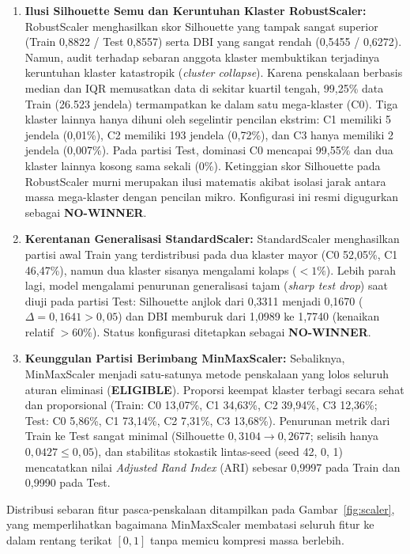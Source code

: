 \documentclass[conference]{IEEEtran}
\begin{document}
\begin{enumerate}
\item \textbf{Ilusi Silhouette Semu dan Keruntuhan Klaster RobustScaler:} RobustScaler menghasilkan skor Silhouette yang tampak sangat superior (Train 0,8822 / Test 0,8557) serta DBI yang sangat rendah (0,5455 / 0,6272). Namun, audit terhadap sebaran anggota klaster membuktikan terjadinya keruntuhan klaster katastropik (\textit{cluster collapse}). Karena penskalaan berbasis median dan IQR memusatkan data di sekitar kuartil tengah, 99,25\% data Train (26.523 jendela) termampatkan ke dalam satu mega-klaster (C0). Tiga klaster lainnya hanya dihuni oleh segelintir pencilan ekstrim: C1 memiliki 5 jendela (0,01\%), C2 memiliki 193 jendela (0,72\%), dan C3 hanya memiliki 2 jendela (0,007\%). Pada partisi Test, dominasi C0 mencapai 99,55\% dan dua klaster lainnya kosong sama sekali (0\%). Ketinggian skor Silhouette pada RobustScaler murni merupakan ilusi matematis akibat isolasi jarak antara massa mega-klaster dengan pencilan mikro. Konfigurasi ini resmi digugurkan sebagai \textbf{NO-WINNER}.

\item \textbf{Kerentanan Generalisasi StandardScaler:} StandardScaler menghasilkan partisi awal Train yang terdistribusi pada dua klaster mayor (C0 52,05\%, C1 46,47\%), namun dua klaster sisanya mengalami kolaps ($<1\%$). Lebih parah lagi, model mengalami penurunan generalisasi tajam (\textit{sharp test drop}) saat diuji pada partisi Test: Silhouette anjlok dari 0,3311 menjadi 0,1670 ($\Delta = 0,1641 > 0,05$) dan DBI memburuk dari 1,0989 ke 1,7740 (kenaikan relatif $> 60\%$). Status konfigurasi ditetapkan sebagai \textbf{NO-WINNER}.

\item \textbf{Keunggulan Partisi Berimbang MinMaxScaler:} Sebaliknya, MinMaxScaler menjadi satu-satunya metode penskalaan yang lolos seluruh aturan eliminasi (\textbf{ELIGIBLE}). Proporsi keempat klaster terbagi secara sehat dan proporsional (Train: C0 13,07\%, C1 34,63\%, C2 39,94\%, C3 12,36\%; Test: C0 5,86\%, C1 73,14\%, C2 7,31\%, C3 13,68\%). Penurunan metrik dari Train ke Test sangat minimal (Silhouette $0,3104 \rightarrow 0,2677$; selisih hanya $0,0427 \le 0,05$), dan stabilitas stokastik lintas-seed (seed 42, 0, 1) mencatatkan nilai \textit{Adjusted Rand Index} (ARI) sebesar 0,9997 pada Train dan 0,9990 pada Test.
\end{enumerate}

Distribusi sebaran fitur pasca-penskalaan ditampilkan pada Gambar~\ref{fig:scaler}, yang memperlihatkan bagaimana MinMaxScaler membatasi seluruh fitur ke dalam rentang terikat $[0, 1]$ tanpa memicu kompresi massa berlebih.
\end{document}
